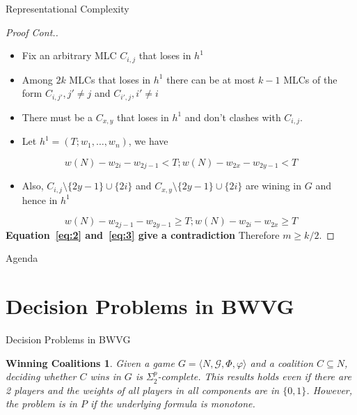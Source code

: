 \documentclass{beamer}
\begin{document}
\begin{frame}[fragile]{Representational Complexity}
  \begin{proof}[Proof Cont.]
    \begin{itemize}
      \item Fix an arbitrary MLC $C_{i,j}$ that loses in $h^1$
      \item Among $2k$ MLCs that loses in $h^1$ there can be at most $k - 1$ MLCs of the form
      $C_{i,j'}, j' \neq j$ and $C_{i',j}, i' \neq i$
      \item There must be a $C_{x,y}$ that loses in $h^1$ and don't clashes with $C_{i,j}$.
      \item Let $h^1 = (T; w_1, \dots, w_n)$, we have
    \end{itemize}
    \begin{equation}
      w(N) - w_{2i} - w_{2j - 1} < T; w(N) - w_{2x} - w_{2y - 1} < T\label{eq:2}
    \end{equation}
    \begin{itemize}
      \item Also, $C_{i,j} \setminus \{2y -1\} \cup \{2i\}$ and $C_{x,y} \setminus \{2y -1\} \cup \{2i\}$ are wining in $G$ and hence in $h^1$
    \end{itemize}
    \begin{equation}
      w(N) - w_{2j - 1} - w_{2y - 1} \geq T; w(N) - w_{2i} - w_{2x} \geq T\label{eq:3}
    \end{equation}
    \textbf{Equation~\ref{eq:2} and~\ref{eq:3} give a contradiction}
    Therefore $m \geq k/2$.
\end{proof}
\end{frame}


\begin{frame}[fragile]{Agenda}
  \section{Decision Problems in BWVG}
  \tableofcontents[currentsection]
\end{frame}

\begin{frame}[fragile]{Decision Problems in BWVG}
  \newtheorem{theorem3}{Winning Coalitions}
  \begin{theorem3}
    Given a game $G = \langle N, \mathcal{G}, \Phi, \varphi \rangle$ and a coalition $C \subseteq N$, 
    deciding whether $C$ wins in $G$ is $\Sigma_2^p$-complete. This results holds even if there are 2 players
    and the weights of all players in all components are in $\{0,1\}$. However, the problem is in $P$ if the underlying
    formula is monotone.
  \end{theorem3}
\end{frame}
\end{document}
